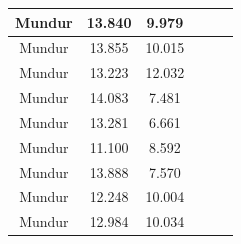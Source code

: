 \begin{longtable}{|c|c|c|c|c|c|}
  Mundur         & 13.840              & 9.979            \\ \hline
  Mundur         & 13.855              & 10.015           \\ \hline
  Mundur         & 13.223              & 12.032           \\ \hline
  Mundur         & 14.083              & 7.481            \\ \hline
  Mundur         & 13.281              & 6.661            \\ \hline
  Mundur         & 11.100              & 8.592            \\ \hline
  Mundur         & 13.888              & 7.570            \\ \hline
  Mundur         & 12.248              & 10.004           \\ \hline
  Mundur         & 12.984              & 10.034           \\ \hline
\end{longtable}

